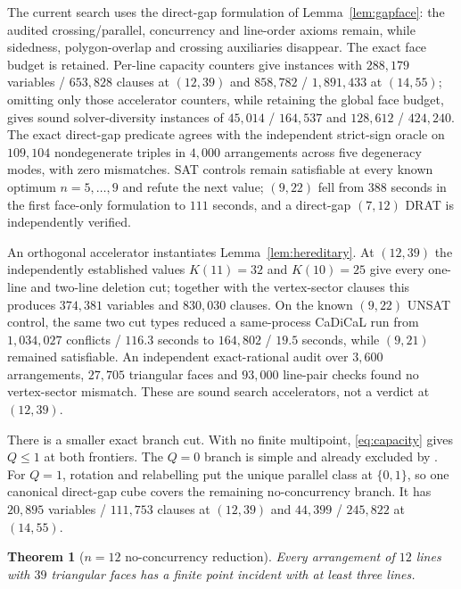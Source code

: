 \documentclass[11pt]{article}
\newtheorem{theorem}{Theorem}
\theoremstyle{definition}
\begin{document}
The current search uses the direct-gap formulation of
Lemma~\ref{lem:gapface}: the audited crossing/parallel, concurrency and
line-order axioms remain, while sidedness, polygon-overlap and crossing
auxiliaries disappear. The exact face budget is retained. Per-line capacity
counters give instances with $288{,}179$ variables / $653{,}828$ clauses at
$(12,39)$ and $858{,}782$ / $1{,}891{,}433$ at $(14,55)$; omitting only
those accelerator counters, while retaining the global face budget, gives
sound solver-diversity instances of $45{,}014$ / $164{,}537$ and
$128{,}612$ / $424{,}240$. The exact direct-gap predicate agrees with the
independent strict-sign oracle on $109{,}104$ nondegenerate triples in
$4{,}000$ arrangements across five degeneracy modes, with zero mismatches.
SAT controls remain satisfiable at every known optimum $n=5,\dots,9$ and
refute the next value; $(9,22)$ fell from $388$ seconds in the first
face-only formulation to $111$ seconds, and a direct-gap $(7,12)$ DRAT is
independently verified.

An orthogonal accelerator instantiates Lemma~\ref{lem:hereditary}. At
$(12,39)$ the independently established values $K(11)=32$ and $K(10)=25$
give every one-line and two-line deletion cut; together with the vertex-sector
clauses this produces $374{,}381$ variables and $830{,}030$ clauses. On the
known $(9,22)$ UNSAT control, the same two cut types reduced a same-process
CaDiCaL run from $1{,}034{,}027$ conflicts / $116.3$ seconds to $164{,}802$ /
$19.5$ seconds, while $(9,21)$ remained satisfiable. An independent
exact-rational audit over $3{,}600$ arrangements, $27{,}705$ triangular faces
and $93{,}000$ line-pair checks found no vertex-sector mismatch. These are
sound search accelerators, not a verdict at $(12,39)$.

There is a smaller exact branch cut. With no finite multipoint,
\eqref{eq:capacity} gives $Q\le1$ at both frontiers. The $Q=0$ branch is
simple and already excluded by \cite{Blanc}. For $Q=1$, rotation and
relabelling put the unique parallel class at $\{0,1\}$, so one canonical
direct-gap cube covers the remaining no-concurrency branch. It has
$20{,}895$ variables / $111{,}753$ clauses at $(12,39)$ and $44{,}399$ /
$245{,}822$ at $(14,55)$.

\begin{theorem}[$n=12$ no-concurrency reduction]\label{thm:n12q1}
Every arrangement of $12$ lines with $39$ triangular faces has a finite point
incident with at least three lines.
\end{theorem}
\end{document}

